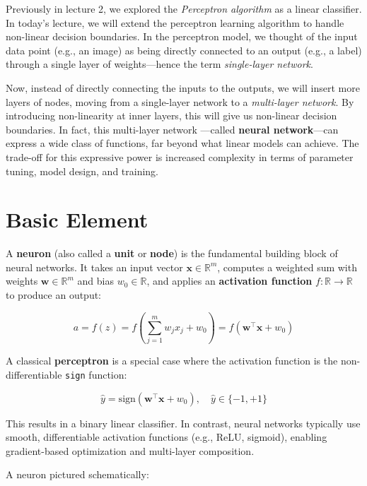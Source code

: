 \documentclass[11pt]{article}
\begin{document}
Previously in lecture 2, we explored the {\em Perceptron algorithm} as a linear classifier. In today's lecture, we will extend the perceptron learning algorithm to handle non-linear decision boundaries. In the perceptron model, we thought of the input data point (e.g., an image) as being directly connected to an output (e.g., a label) through a single layer of weights---hence the term \textit{single-layer network}.

Now, instead of directly connecting the inputs to the outputs, we will insert more layers of nodes, moving from a single-layer network to a \textit{multi-layer network}. By introducing non-linearity
at inner layers, this will give us non-linear decision boundaries. In fact, this multi-layer network ---called \textbf{neural network}---can express a wide class of functions, far beyond what linear models can achieve. The trade-off for this expressive power is increased complexity in terms of parameter tuning, model design, and training.


\section{Basic Element}

A \textbf{neuron} (also called a \textbf{unit} or \textbf{node}) is the fundamental building block of neural networks. It takes an input vector \( \mathbf{x} \in \mathbb{R}^m \), computes a weighted sum with weights \( \mathbf{w} \in \mathbb{R}^m \) and bias \( w_0 \in \mathbb{R} \), and applies an \textbf{activation function} \( f : \mathbb{R} \rightarrow \mathbb{R} \) to produce an output:

\[
a = f(z) = f\left(\sum_{j=1}^m w_j x_j + w_0\right) = f(\mathbf{w}^\top \mathbf{x} + w_0)
\]

A classical \textbf{perceptron} is a special case where the activation function is the non-differentiable \texttt{sign} function:

\[
\hat{y} = \mathrm{sign}(\mathbf{w}^\top \mathbf{x} + w_0), \quad \hat{y} \in \{-1, +1\}
\]

This results in a binary linear classifier. In contrast, neural networks typically use smooth, differentiable activation functions (e.g., ReLU, sigmoid), enabling gradient-based optimization and multi-layer composition.


A neuron pictured schematically:
\end{document}
